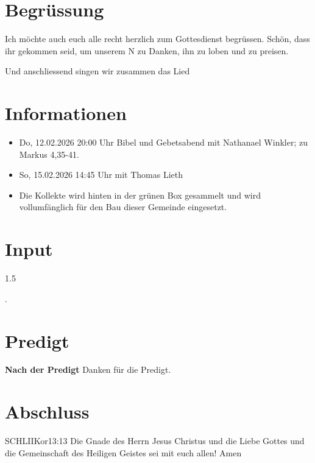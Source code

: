\documentclass[fontsize=14pt]{mybib}
\begin{document}
\section{Begrüssung}
Ich möchte auch euch alle recht herzlich zum Gottesdienst begrüssen. Schön, dass ihr gekommen seid, um unserem \herr N zu Danken, ihn zu loben und zu preisen.

\beten{} Und anschliessend singen wir zusammen das Lied



\section{Informationen}
\begin{itemize}
    \item {} Do, 12.02.2026 20:00 Uhr Bibel und Gebetsabend mit Nathanael Winkler; zu Markus 4,35-41.
    \item {} So, 15.02.2026 14:45 Uhr mit Thomas Lieth
    \item {} Die Kollekte wird hinten in der grünen Box gesammelt und wird vollumfänglich für den Bau dieser Gemeinde eingesetzt.
\end{itemize}

\section{ Input }
\begin{spacing}{1.5}
    
    \lied{}.

\end{spacing}

\section{Predigt}
\textbf{Nach der Predigt}\newline
Danken für die Predigt.\newline

\section{Abschluss}

\lied{}

\beten{}

\begin{bibelbox}{SCHL}{IIKor}{13:13}
    Die Gnade des Herrn Jesus Christus und die Liebe Gottes und die Gemeinschaft des Heiligen Geistes sei mit euch allen! Amen
\end{bibelbox}
\end{document}
